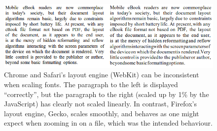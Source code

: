 \begin{figure}
    \includegraphics[width=\textwidth]{gfx/webkitisshit}
    \caption[Inconsistent font scaling by WebKit]{Chrome and Safari's layout engine (WebKit) can be inconsistent when scaling fonts. The paragraph to the left is displayed ``correctly'', but the paragraph to the right (scaled up by 1\% by the JavaScript) has clearly not scaled linearly. In contrast, Firefox's layout engine, Gecko, scales smoothly, and behaves as one might expect when zooming in on a \pdf{} file, which was the intended behaviour.}
    \label{fig:craprenderer}
\end{figure}



